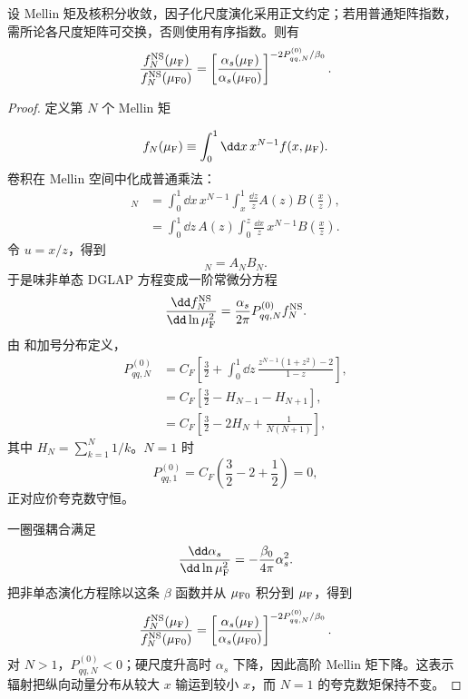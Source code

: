 \begin{proposition}
设 Mellin 矩及核积分收敛，因子化尺度演化采用正文约定；若用普通矩阵指数，需所论各尺度矩阵可交换，否则使用有序指数。则有
\begin{equation}
 {
 \frac{f_N^{\rm NS}(\mu_{\rm F})}{f_N^{\rm NS}(\mu_{\rm F0})}
 =\left[
 \frac{\alpha_s(\mu_{\rm F})}{\alpha_s(\mu_{\rm F0})}
 \right]^{-2P_{qq,N}^{(0)}/\beta_0}.}
\label{eq:dglap-mellin-solution-dp13}
\end{equation}
\end{proposition}
\begin{proof}
定义第 $N$ 个 Mellin 矩

\begin{equation*}
 f_N(\mu_{\rm F})
 \equiv\int_0^1\dd x\,x^{N-1}f(x,\mu_{\rm F}).
\end{equation*}
卷积在 Mellin 空间中化成普通乘法：
\begin{align*}
 [A\otimes B]_N
 &=\int_0^1\dd x\,x^{N-1}
 \int_x^1\frac{\dd z}{z}
 A(z)B\!\left(\frac{x}{z}\right),\\
 &=\int_0^1\dd z\,A(z)
 \int_0^z\frac{\dd x}{z}\,x^{N-1}
 B\!\left(\frac{x}{z}\right).
\end{align*}
令 $u=x/z$，得到
\begin{equation*}
 [A\otimes B]_N=A_NB_N.
\end{equation*}
于是味非单态 DGLAP 方程变成一阶常微分方程
\begin{equation*}
 \frac{\dd f_N^{\rm NS}}{\dd\ln\mu_{\rm F}^2}
 =\frac{\alpha_s}{2\pi}P_{qq,N}^{(0)}f_N^{\rm NS}.
\end{equation*}
由 和加号分布定义，
\begin{align*}
 P_{qq,N}^{(0)}
 &=C_F\left[
 \frac32+
 \int_0^1\dd z\,
 \frac{z^{N-1}(1+z^2)-2}{1-z}
 \right],\\
 &=C_F\left[
 \frac32-H_{N-1}-H_{N+1}
 \right],\\
 &=C_F\left[
 \frac32-2H_N+\frac{1}{N(N+1)}
 \right],
\end{align*}
其中 $H_N=\sum_{k=1}^N1/k$。$N=1$ 时
\begin{equation*}
 P_{qq,1}^{(0)}
 =C_F\left(\frac32-2+\frac12\right)=0,
\end{equation*}
正对应价夸克数守恒。

一圈强耦合满足
\begin{equation*}
 \frac{\dd\alpha_s}{\dd\ln\mu_{\rm F}^2}
 =-\frac{\beta_0}{4\pi}\alpha_s^2.
\end{equation*}
把非单态演化方程除以这条 $\beta$ 函数并从 $\mu_{\rm F0}$ 积分到 $\mu_{\rm F}$，得到
\begin{equation*}
 \frac{f_N^{\rm NS}(\mu_{\rm F})}{f_N^{\rm NS}(\mu_{\rm F0})}
 =\left[
 \frac{\alpha_s(\mu_{\rm F})}{\alpha_s(\mu_{\rm F0})}
 \right]^{-2P_{qq,N}^{(0)}/\beta_0}.
\end{equation*}
对 $N>1$，$P_{qq,N}^{(0)}<0$；硬尺度升高时 $\alpha_s$ 下降，因此高阶 Mellin 矩下降。这表示辐射把纵向动量分布从较大 $x$ 输运到较小 $x$，而 $N=1$ 的夸克数矩保持不变。
\end{proof}

